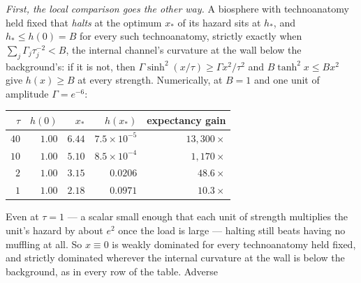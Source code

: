\begin{remark}
\emph{First, the local comparison goes the other way.} A biosphere with
technoanatomy held fixed that \emph{halts} at the optimum $x_\ast$ of its
hazard sits at $h_\ast$, and $h_\ast\le h(0)=B$ for every such
technoanatomy, strictly exactly when $\sum_j\Gamma_j\tau_j^{-2}<B$, the
internal channel's curvature at the wall below the background's: if it
is not, then $\Gamma\sinh^2(x/\tau)\ge\Gamma x^2/\tau^2$ and
$B\tanh^2x\le Bx^2$ give $h(x)\ge B$ at every strength. Numerically, at
$B=1$ and one unit of amplitude $\Gamma=e^{-6}$:
\begin{center}\small
\begin{tabular}{@{}rrrrr@{}}
\toprule
$\tau$ & $h(0)$ & $x_\ast$ & $h(x_\ast)$ & expectancy gain\\
\midrule
$40$ & $1.00$ & $6.44$ & $7.5\times10^{-5}$ & $13{,}300\times$\\
$10$ & $1.00$ & $5.10$ & $8.5\times10^{-4}$ & $1{,}170\times$\\
$2$ & $1.00$ & $3.15$ & $0.0206$ & $48.6\times$\\
$1$ & $1.00$ & $2.18$ & $0.0971$ & $10.3\times$\\
\bottomrule
\end{tabular}
\end{center}
Even at $\tau=1$ --- a scalar small enough that each unit of strength
multiplies the unit's hazard by about $e^{2}$ once the load is large ---
halting still beats having no muffling at all. So $x\equiv0$ is weakly
dominated for every technoanatomy held fixed, and strictly dominated
wherever the internal curvature at the wall is below the background, as
in every row of the table. Adverse

\end{remark}
